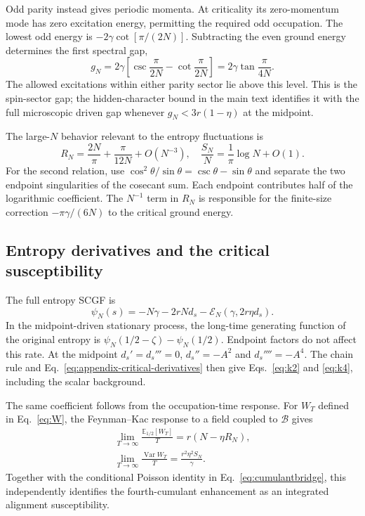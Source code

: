 \documentclass[aps,pre,reprint,amsmath,amssymb,longbibliography,floatfix]{revtex4-2}
\newcommand{\E}{\mathbb E}
\newcommand{\Var}{\operatorname{Var}}
\begin{document}
Odd parity instead gives periodic momenta. At criticality its zero-momentum
mode has zero excitation energy, permitting the required odd occupation.
The lowest odd energy is $-2\gamma\cot\left[\pi/(2N)\right]$. Subtracting the even
ground energy determines the first spectral gap,
\begin{equation}
 g_N=2\gamma\left[\csc\frac{\pi}{2N}
                 -\cot\frac{\pi}{2N}\right]
     =2\gamma\tan\frac{\pi}{4N}.
 \label{eq:appendix-critical-gap}
\end{equation}
The allowed excitations within either parity sector lie above this level.
This is the spin-sector gap; the hidden-character bound in the main text
identifies it with the full microscopic driven gap whenever
$g_N<3r(1-\eta)$ at the midpoint.

The large-$N$ behavior relevant to the entropy fluctuations is
\begin{equation}
 R_N=\frac{2N}{\pi}+\frac{\pi}{12N}+O(N^{-3}),\quad
 \frac{S_N}{N}=\frac1\pi\log N+O(1).
 \label{eq:appendix-critical-asymptotics}
\end{equation}
For the second relation, use
$\cos^2\theta/\sin\theta=\csc\theta-\sin\theta$ and separate the two
endpoint singularities of the cosecant sum. Each endpoint contributes
half of the logarithmic coefficient. The $N^{-1}$ term in $R_N$ is
responsible for the finite-size correction $-\pi\gamma/(6N)$ to the
critical ground energy.

\subsection{Entropy derivatives and the critical susceptibility}
The full entropy SCGF is
\begin{equation}
 \psi_N(s)=-N\gamma-2rNd_s-\mathcal E_N(\gamma,2r\eta d_s).
 \label{eq:appendix-full-scgf}
\end{equation}
In the midpoint-driven stationary process, the long-time generating
function of the original entropy is
$\psi_N(1/2-\zeta)-\psi_N(1/2)$. Endpoint factors do not affect this rate.
At the midpoint $d_s'=d_s'''=0$, $d_s''=-A^2$ and $d_s''''=-A^4$.
The chain rule and Eq.~\eqref{eq:appendix-critical-derivatives} then
give Eqs.~\eqref{eq:k2} and \eqref{eq:k4}, including the scalar background.

The same coefficient follows from the occupation-time response.
For $W_T$ defined in Eq.~\eqref{eq:W}, the Feynman--Kac response to
a field coupled to $\mathcal B$ gives
\begin{equation}
 \begin{gathered}
 \lim_{T\to\infty}\frac{\E_{1/2}\left[W_T\right]}{T}=r(N-\eta R_N),\\
 \lim_{T\to\infty}\frac{\Var W_T}{T}
 =\frac{r^2\eta^2S_N}{\gamma}.
 \end{gathered}
 \label{eq:appendix-dwell-response}
\end{equation}
Together with the conditional Poisson identity in
Eq.~\eqref{eq:cumulantbridge}, this independently identifies the
fourth-cumulant enhancement as an integrated alignment susceptibility.
\end{document}
